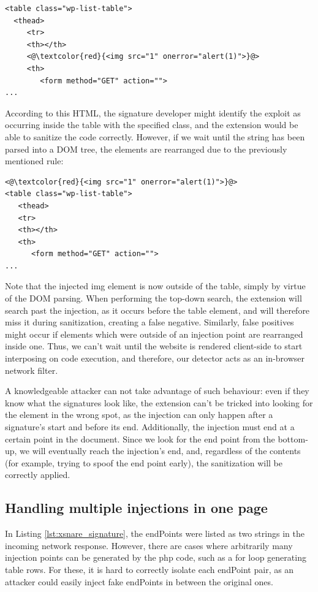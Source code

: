 \begin{lstlisting}
<table class="wp-list-table">
  <thead>
     <tr>
     <th></th>
     <@\textcolor{red}{<img src="1" onerror="alert(1)">}@>
     <th>
   	    <form method="GET" action="">
...
\end{lstlisting}

According to this HTML, the signature developer might identify the exploit as occurring inside the table with the specified class, and the extension would be able to sanitize the code correctly. However, if we wait until the string has been parsed into a DOM tree, the elements are rearranged due to the previously mentioned rule:

\begin{lstlisting}
<@\textcolor{red}{<img src="1" onerror="alert(1)">}@>
<table class="wp-list-table">
   <thead>
   <tr>
   <th></th>
   <th>
      <form method="GET" action="">
...
\end{lstlisting}

Note that the injected img element is now outside of the table, simply by virtue of the DOM parsing. When performing the top-down search, the extension will search past the injection, as it occurs before the table element, and will therefore miss it during sanitization, creating a false negative. Similarly, false positives might occur if elements which were outside of an injection point are rearranged inside one. Thus, we can't wait until the website is rendered client-side to start interposing on code execution, and therefore, our detector acts as an in-browser network filter.

A knowledgeable attacker can not take advantage of such behaviour: even if they know what the signatures look like, the extension can't be tricked into looking for the element in the wrong spot, as the injection can only happen after a signature's start and before its end. Additionally, the injection must end at a certain point in the document. Since we look for the end point from the bottom-up, we will eventually reach the injection's end, and, regardless of the contents (for example, trying to spoof the end point early), the sanitization will be correctly applied.

\subsection{Handling multiple injections in one page} \label{multiple_injections}
In Listing \ref{lst:xsnare_signature}, the endPoints were listed as two strings in the incoming network response. However, there are cases where arbitrarily many injection points can be generated by the php code, such as a for loop generating table rows. For these, it is hard to correctly isolate each endPoint pair, as an attacker could easily inject fake endPoints in between the original ones.

